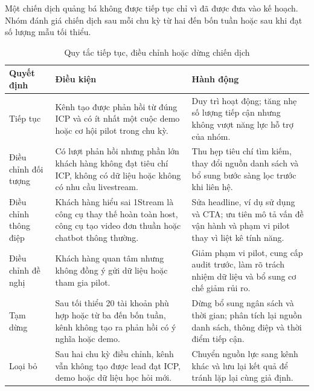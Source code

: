 Một chiến dịch quảng bá không được tiếp tục chỉ vì đã được đưa vào kế hoạch. Nhóm đánh giá chiến dịch sau mỗi chu kỳ từ hai đến bốn tuần hoặc sau khi đạt số lượng mẫu tối thiểu.

\begin{table}[H]
    \centering
    \caption{Quy tắc tiếp tục, điều chỉnh hoặc dừng chiến dịch}
    \label{tab:campaign-decision-rules}
    \renewcommand{\arraystretch}{1.25}
    \begin{tabularx}{\textwidth}{
        p{}
        X
        X
    }
        \hline
        \textbf{Quyết định}
        & \textbf{Điều kiện}
        & \textbf{Hành động} \\
        \hline

        Tiếp tục
        &
        Kênh tạo được phản hồi từ đúng ICP và có ít nhất một cuộc demo hoặc cơ hội pilot trong chu kỳ.
        &
        Duy trì hoạt động; tăng nhẹ số lượng tiếp cận nhưng không vượt năng lực hỗ trợ của nhóm. \\

        \hline

        Điều chỉnh đối tượng
        &
        Có lượt phản hồi nhưng phần lớn khách hàng không đạt tiêu chí ICP, không có dữ liệu hoặc không có nhu cầu livestream.
        &
        Thu hẹp tiêu chí tìm kiếm, thay đổi nguồn danh sách và bổ sung bước sàng lọc trước khi liên hệ. \\

        \hline

        Điều chỉnh thông điệp
        &
        Khách hàng hiểu sai 1Stream là công cụ thay thế hoàn toàn host, công cụ tạo video đơn thuần hoặc chatbot thông thường.
        &
        Sửa headline, ví dụ sử dụng và CTA; ưu tiên mô tả vấn đề vận hành và phạm vi pilot thay vì liệt kê tính năng. \\

        \hline

        Điều chỉnh đề nghị
        &
        Khách hàng quan tâm nhưng không đồng ý gửi dữ liệu hoặc tham gia pilot.
        &
        Giảm phạm vi pilot, cung cấp audit trước, làm rõ trách nhiệm dữ liệu và bổ sung cơ chế giảm rủi ro. \\

        \hline

        Tạm dừng
        &
        Sau tối thiểu 20 tài khoản phù hợp hoặc từ ba đến bốn tuần, kênh không tạo ra phản hồi có ý nghĩa hoặc demo.
        &
        Dừng bổ sung ngân sách và thời gian; phân tích lại nguồn danh sách, thông điệp và thời điểm tiếp cận. \\

        \hline

        Loại bỏ
        &
        Sau hai chu kỳ điều chỉnh, kênh vẫn không tạo được lead đạt ICP, demo hoặc dữ liệu học hỏi mới.
        &
        Chuyển nguồn lực sang kênh khác và lưu lại kết quả để tránh lặp lại cùng giả định. \\

        \hline
    \end{tabularx}
\end{table}

